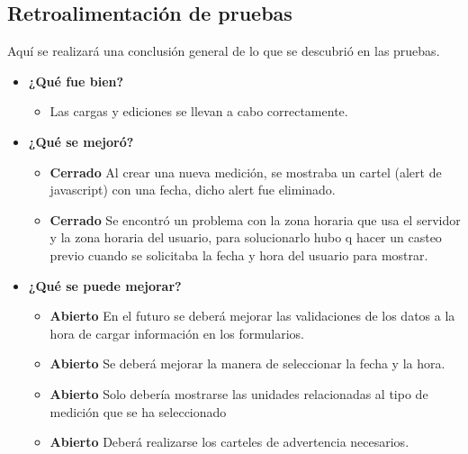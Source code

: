 \subsection{Retroalimentación de pruebas}
Aquí se realizará una conclusión general de lo que se descubrió en las pruebas.
	\begin{itemize}
		\item \textbf{¿Qué fue bien?}
        	\begin{itemize}
				\item        Las cargas y ediciones se llevan a cabo correctamente.
			\end{itemize}

   		\item \textbf{¿Qué se mejoró?}
        	\begin{itemize}
				\item \textbf{Cerrado} Al crear una nueva medición, se mostraba un cartel (alert de javascript) con una fecha, dicho alert fue eliminado.
                \item \textbf{Cerrado} Se encontró un problema con la zona horaria que usa el servidor y la zona horaria del usuario, para solucionarlo hubo q hacer un casteo previo cuando se solicitaba la fecha y hora del usuario para mostrar.
			\end{itemize}

   		\item \textbf{¿Qué se puede mejorar?}
        	\begin{itemize}
		        \item \textbf{Abierto} En el futuro se deberá mejorar las validaciones de los datos a la hora de cargar información en los formularios.
        		\item \textbf{Abierto} Se deberá mejorar la manera de seleccionar la fecha y la hora.
		        \item \textbf{Abierto} Solo debería mostrarse las unidades relacionadas al tipo de medición que se ha seleccionado  
                \item \textbf{Abierto} Deberá realizarse los carteles de advertencia necesarios.
            \end{itemize}
        

	\end{itemize}